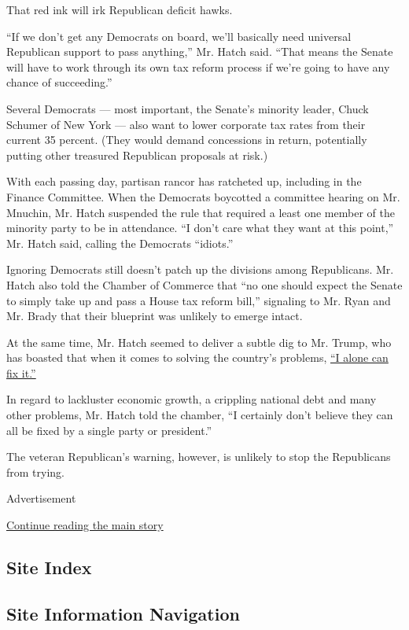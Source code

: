 That red ink will irk Republican deficit hawks.

``If we don't get any Democrats on board, we'll basically need universal
Republican support to pass anything,'' Mr. Hatch said. ``That means the
Senate will have to work through its own tax reform process if we're
going to have any chance of succeeding.''

Several Democrats --- most important, the Senate's minority leader,
Chuck Schumer of New York --- also want to lower corporate tax rates
from their current 35 percent. (They would demand concessions in return,
potentially putting other treasured Republican proposals at risk.)

With each passing day, partisan rancor has ratcheted up, including in
the Finance Committee. When the Democrats boycotted a committee hearing
on Mr. Mnuchin, Mr. Hatch suspended the rule that required a least one
member of the minority party to be in attendance. ``I don't care what
they want at this point,'' Mr. Hatch said, calling the Democrats
``idiots.''

Ignoring Democrats still doesn't patch up the divisions among
Republicans. Mr. Hatch also told the Chamber of Commerce that ``no one
should expect the Senate to simply take up and pass a House tax reform
bill,'' signaling to Mr. Ryan and Mr. Brady that their blueprint was
unlikely to emerge intact.

At the same time, Mr. Hatch seemed to deliver a subtle dig to Mr. Trump,
who has boasted that when it comes to solving the country's problems,
\href{http://video.cnbc.com/gallery/?video=3000536691}{``I alone can fix
it.''}

In regard to lackluster economic growth, a crippling national debt and
many other problems, Mr. Hatch told the chamber, ``I certainly don't
believe they can all be fixed by a single party or president.''

The veteran Republican's warning, however, is unlikely to stop the
Republicans from trying.

Advertisement

\protect\hyperlink{after-bottom}{Continue reading the main story}

\hypertarget{site-index}{%
\subsection{Site Index}\label{site-index}}

\hypertarget{site-information-navigation}{%
\subsection{Site Information
Navigation}\label{site-information-navigation}}

